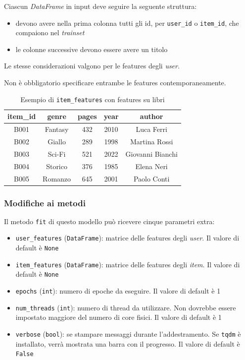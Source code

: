 Ciascun \textit{DataFrame} in input deve seguire la seguente struttura:
\begin{itemize}
    \item devono avere nella prima colonna tutti gli id, per \texttt{user\_id} o \texttt{item\_id}, che compaiono nel \textit{trainset}
    \item le colonne successive devono essere avere un titolo
\end{itemize}

Le stesse considerazioni valgono per le features degli \textit{user}.

Non è obbligatorio specificare entrambe le features contemporaneamente.

\begin{table}[H]
    \centering
    \begin{tabular}{|c|c|c|c|c|}
    \hline
    \textbf{item\_id} & \textbf{genre} & \textbf{pages} & \textbf{year} & \textbf{author} \\
    \hline
    B001 & Fantasy       & 432 & 2010 & Luca Ferri       \\
    B002 & Giallo        & 289 & 1998 & Martina Rossi     \\
    B003 & Sci-Fi        & 521 & 2022 & Giovanni Bianchi  \\
    B004 & Storico       & 376 & 1985 & Elena Neri        \\
    B005 & Romanzo       & 645 & 2001 & Paolo Conti       \\
    \hline
    \end{tabular}
    \caption{Esempio di \texttt{item\_features} con features su libri}
    \label{tab:book_metadata}
\end{table}

\subsubsection{Modifiche ai metodi}

Il metodo \texttt{fit} di questo modello può ricevere cinque parametri extra:

\begin{itemize}
    \item \texttt{user\_features} (\texttt{DataFrame}): matrice delle features degli \textit{user}. Il valore di default è \texttt{None}
    \item \texttt{item\_features} (\texttt{DataFrame}): matrice delle features degli \textit{item}. Il valore di default è \texttt{None}
    \item \texttt{epochs} (\texttt{int}): numero di epoche da eseguire. Il valore di default è 1
    \item \texttt{num\_threads} (\texttt{int}): numero di thread da utilizzare. Non dovrebbe essere impostato maggiore del numero di core fisici. Il valore di default è 1
    \item \texttt{verbose} (\texttt{bool}): se stampare messaggi durante l'addestramento. Se \texttt{tqdm} è installato, verrà mostrata una barra con il progresso. Il valore di default è \texttt{False}
\end{itemize}

